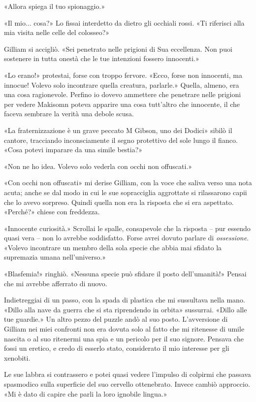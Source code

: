 «Allora spiega il tuo spionaggio.»

«Il mio... cosa?» Lo fissai interdetto da dietro gli occhiali rossi. «Ti
riferisci alla mia visita nelle celle del colosseo?»

Gilliam si accigliò. «Sei penetrato nelle prigioni di Sua eccellenza.
Non puoi sostenere in tutta onestà che le tue intenzioni fossero
innocenti.»

«Lo erano!» protestai, forse con troppo fervore. «Ecco, forse non
innocenti, ma innocue! Volevo solo incontrare quella creatura,
parlarle.» Quella, almeno, era una cosa ragionevole. Perfino io dovevo
ammettere che penetrare nelle prigioni per vedere Makisomn {poteva}
apparire una cosa tutt'altro che innocente, il che faceva sembrare la
verità una debole scusa.

«La fraternizzazione è un grave peccato M Gibson, uno dei Dodici» sibilò
il cantore, tracciando inconsciamente il segno protettivo del sole lungo
il fianco. «Cosa potevi imparare da una simile bestia?»

«Non ne ho idea. Volevo solo vederla con occhi non offuscati.»

«Con occhi non offuscati» mi derise Gilliam, con la voce che saliva
verso una nota acuta; anche se dal modo in cui le sue sopracciglia
aggrottate si rilassarono capii che lo avevo sorpreso. Quindi quella non
era la risposta che si era aspettato. «Perché?» chiese con freddezza.

«Innocente curiosità.» Scrollai le spalle, consapevole che la risposta
-- pur essendo quasi vera -- non lo avrebbe soddisfatto. Forse avrei
dovuto parlare di \emph{ossessione}. «Volevo incontrare un membro della
sola specie che abbia mai sfidato la supremazia umana nell'universo.»

«Blasfemia!» ringhiò. «Nessuna specie può sfidare il posto
dell'umanità!» Pensai che mi avrebbe afferrato di nuovo.

Indietreggiai di un passo, con la spada di plastica che mi sussultava
nella mano. «Dillo alla nave da guerra che si sta riprendendo in orbita»
sussurrai. «Dillo alle tue guardie.» Un altro pezzo del puzzle andò al
suo posto. L'avversione di Gilliam nei miei confronti non era dovuta
solo al fatto che mi ritenesse di umile nascita o al suo ritenermi una
spia e un pericolo per il suo signore. Pensava che fossi un eretico, e
credo di esserlo stato, considerato il mio interesse per gli xenobiti.

Le sue labbra si contrassero e potei quasi vedere l'impulso di colpirmi
che passava spasmodico sulla superficie del suo cervello ottenebrato.
Invece cambiò approccio. «Mi è dato di capire che parli la loro ignobile
lingua.»

